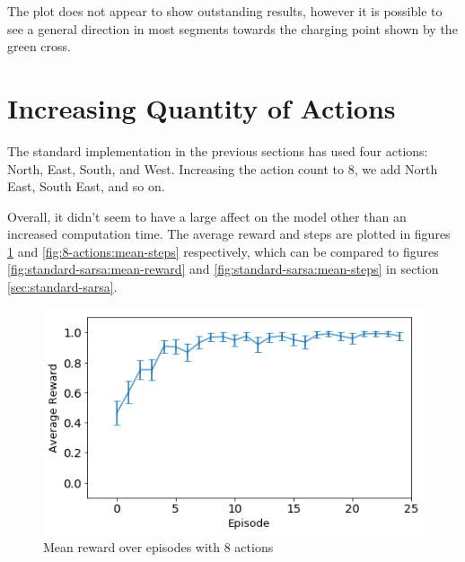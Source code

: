 \documentclass[11pt,journal,transmag,final]{IEEEtran}
\begin{document}
    The plot does not appear to show outstanding results, however it is possible to see a general direction in most segments towards the charging point shown by the green cross.

    \section{Increasing Quantity of Actions}

    The standard implementation in the previous sections has used four actions: North, East, South, and West. Increasing the action count to 8, we add North East, South East, and so on.

    Overall, it didn't seem to have a large affect on the model other than an increased computation time. The average reward and steps are plotted in figures \ref{fig:8-actions:mean-reward} and \ref{fig:8-actions:mean-steps} respectively, which can be compared to figures \ref{fig:standard-sarsa:mean-reward} and \ref{fig:standard-sarsa:mean-steps} in section \ref{sec:standard-sarsa}.

    \begin{figure}
        \begin{center}
            \includegraphics[width=\linewidth,keepaspectratio]{figures/8-mean-reward.png}
            \caption{Mean reward over episodes with 8 actions}
            \label{fig:8-actions:mean-reward}
        \end{center}
    \end{figure}
\end{document}
